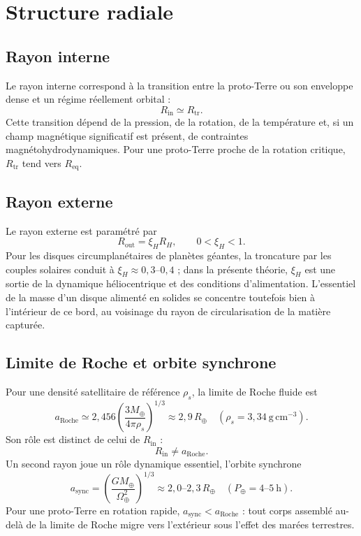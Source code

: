 \documentclass[11pt,a4paper,openany]{report}
\newcommand{\Mt}{M_{\oplus}}
\newcommand{\Rt}{R_{\oplus}}
\newcommand{\Req}{R_{\mathrm{eq}}}
\newcommand{\aR}{a_{\mathrm{Roche}}}
\begin{document}
\section{Structure radiale}
\subsection{Rayon interne}

Le rayon interne correspond à la transition entre la proto-Terre ou son enveloppe dense et un
régime réellement orbital :
\begin{equation}
R_{\mathrm{in}}\simeq R_{\mathrm{tr}}.
\label{eq:Rin}
\end{equation}
Cette transition dépend de la pression, de la rotation, de la température et, si un champ
magnétique significatif est présent, de contraintes magnétohydrodynamiques. Pour une
proto-Terre proche de la rotation critique, $R_{\mathrm{tr}}$ tend vers $\Req$.

\subsection{Rayon externe}

Le rayon externe est paramétré par
\begin{equation}
R_{\mathrm{out}}=\xi_H R_H,\qquad 0<\xi_H<1.
\label{eq:Rout}
\end{equation}
Pour les disques circumplanétaires de planètes géantes, la troncature par les couples solaires
conduit à $\xi_H\approx0{,}3$--$0{,}4$ \cite{QuillenTrilling1998,MartinLubow2011} ; dans la présente
théorie, $\xi_H$ est une sortie de la dynamique héliocentrique et des conditions d'alimentation.
L'essentiel de la masse d'un disque alimenté en solides se concentre toutefois bien à l'intérieur
de ce bord, au voisinage du rayon de circularisation de la matière capturée.

\subsection{Limite de Roche et orbite synchrone}

Pour une densité satellitaire de référence $\rho_s$, la limite de Roche fluide est
\begin{equation}
\aR\simeq2{,}456\left(\frac{3\Mt}{4\pi\rho_s}\right)^{1/3}
\approx2{,}9\,\Rt\quad(\rho_s=3{,}34\ \mathrm{g\,cm^{-3}}).
\label{eq:Roche}
\end{equation}
Son rôle est distinct de celui de $R_{\mathrm{in}}$ :
\begin{equation}
R_{\mathrm{in}}\neq\aR.
\label{eq:RinRoche}
\end{equation}
Un second rayon joue un rôle dynamique essentiel, l'orbite synchrone
\begin{equation}
a_{\mathrm{sync}}=\left(\frac{G\Mt}{\Omega_\oplus^2}\right)^{1/3}\approx2{,}0\text{--}2{,}3\,\Rt
\quad(P_\oplus=4\text{--}5\ \mathrm{h}).
\label{eq:async}
\end{equation}
Pour une proto-Terre en rotation rapide, $a_{\mathrm{sync}}<\aR$ : tout corps assemblé au-delà de
la limite de Roche migre vers l'extérieur sous l'effet des marées terrestres.
\end{document}
